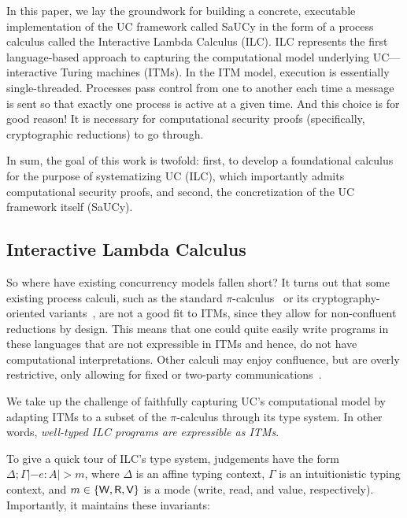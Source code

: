 In this paper, we lay the groundwork for building a concrete, executable
implementation of the UC framework called SaUCy in the form of a process
calculus called the Interactive Lambda Calculus (ILC). ILC represents the first
language-based approach to capturing the computational model underlying
UC---interactive Turing machines (ITMs). In the ITM model, execution is
essentially single-threaded. Processes pass control from one to another each
time a message is sent so that exactly one process is active at a given
time. And this choice is for good reason! It is necessary for computational
security proofs (specifically, cryptographic reductions) to go through.

In sum, the goal of this work is twofold: first, to develop a foundational
calculus for the purpose of systematizing UC (ILC), which importantly admits
computational security proofs, and second, the concretization of the UC
framework itself (SaUCy).

\subsection{Interactive Lambda Calculus}

So where have existing concurrency models fallen short?  It turns out that some
existing process calculi, such as the standard
$\pi$-calculus~\cite{milner1999communicating} or its cryptography-oriented
variants~\cite{abadi1999calculus, abadi2001mobile}, are not a good fit to ITMs,
since they allow for non-confluent reductions by design. This means that one
could quite easily write programs in these languages that are not expressible in
ITMs and hence, do not have computational interpretations. Other calculi may
enjoy confluence, but are overly restrictive, only allowing for fixed or
two-party
communications~\cite{kobayashi1999linearity,bohl2016symbolic,fowler2018session}. 

We take up the challenge of faithfully capturing UC's computational model by
adapting ITMs to a subset of the $\pi$-calculus through its type system. In other
words, \emph{well-typed ILC programs are expressible as ITMs}.

To give a quick tour of ILC's type system, judgements have the form $\Delta ; \Gamma |- e
: A |> m$, where $\Delta$ is an affine typing context, $\Gamma$ is an intuitionistic typing
context, and $m \in \{\textsf{W}, \textsf{R}, \textsf{V}\}$ is a mode (write, read, and value,
respectively). Importantly, it maintains these invariants:

